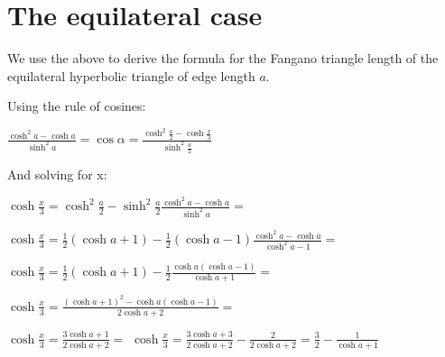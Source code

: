 \documentclass[a4paper,10pt]{article}
\title{}
\author{}
\begin{document}
\maketitle
\begin{abstract}

We consider the family of trianges in the hyperbolic two dimensional space with
angles $\alpha, \beta, \gamma < \frac{\pi}{2}$ and test the Fangano orbits enclosed
in them. We try to find those whose orbits are in some sense 'maximal'. A question
arises as to what sense the maximum is measure since normalization not as simple as
the Euclidean case. We show that the area of the triangle is in may ways a good
normailzation factor and that maximizing the ratio between the length of the Fangano
orbit and the triangle's area makes sense.


\end {abstract}

\section{The equilateral case}

We use the above to derive the formula for the Fangano triangle length of the
equilateral hyperbolic triangle of edge length $a$.

Using the rule of cosines:

\begin{center}
$\frac{\cosh^2{a} - \cosh{a}}{\sinh^2{a}} = \cos{\alpha} = \frac{\cosh^2{\frac{a}{2}} - \cosh{\frac{x}{3}}}{\sinh^2{\frac{a}{2}}}$
\end{center}

And solving for x:

$ \cosh{\frac{x}{3}} = \cosh^2{\frac{a}{2}} - \sinh^2{\frac{a}{2}}\frac{\cosh^2{a} - \cosh{a}}{\sinh^2{a}} = $

$ \cosh{\frac{x}{3}} = \frac{1}{2}\left(\cosh{a}+1\right) - \frac{1}{2}\left(\cosh{a}-1\right)\frac{\cosh^2{a} - \cosh{a}}{\cosh^2{a} - 1} = $

$ \cosh{\frac{x}{3}} = \frac{1}{2}\left(\cosh{a}+1\right) - \frac{1}{2}\frac{\cosh{a}\left(\cosh{a}-1\right)}{\cosh{a} + 1} =$

$ \cosh{\frac{x}{3}} = \frac{\left(\cosh{a}+1\right)^{2} - \cosh{a}\left(\cosh{a}-1\right)}{2\cosh{a} + 2} =$

$ \cosh{\frac{x}{3}} = \frac{3\cosh{a}+1}{2\cosh{a} + 2} =$
$ \cosh{\frac{x}{3}} = \frac{3\cosh{a}+3}{2\cosh{a} + 2} - \frac{2}{2\cosh{a} + 2} = \frac{3}{2} - \frac{1}{\cosh{a} + 1}$
\end{document}

